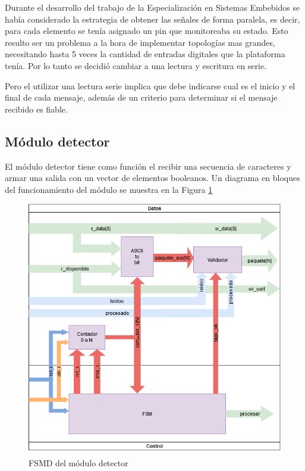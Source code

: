 	Durante el desarrollo del trabajo de la Especialización en Sistemas Embebidos se había considerado la estrategia de obtener las señales de forma paralela, es decir, para cada elemento se tenía asignado un pin que monitoreaba su estado. Esto resulto ser un problema a la hora de implementar topologías mas grandes, necesitando hasta 5 veces la cantidad de entradas digitales que la plataforma tenía. Por lo tanto se decidió cambiar a una lectura y escritura en serie.
	
	Pero el utilizar una lectura serie implica que debe indicarse cual es el inicio y el final de cada mensaje, además de un criterio para determinar si el mensaje recibido es fiable.
	
	\subsection{Módulo detector}
	
		El módulo detector tiene como función el recibir una secuencia de caracteres y armar una salida con un vector de elementos booleanos. Un diagrama en bloques del funcionamiento del módulo se muestra en la Figura \ref{fig:FSMD_Detector}
		
		\begin{figure}[h]
		\centering
			\includegraphics[scale=.6]{./Figures/FSMD-Detector}
			\caption{FSMD del módulo detector}
			\label{fig:FSMD_Detector}
		\end{figure}
		
